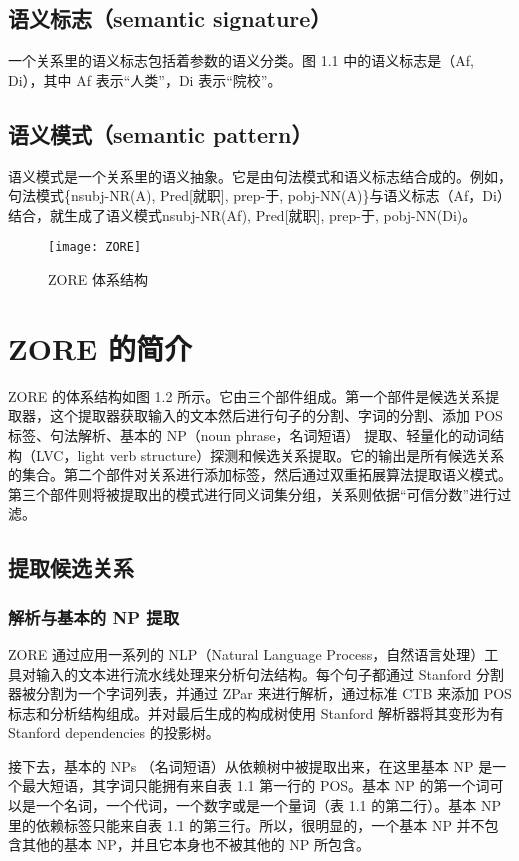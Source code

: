 \subsection{语义标志（semantic signature）}
一个关系里的语义标志包括着参数的语义分类。图 1.1 中的语义标志是（Af, Di），其中 Af 表示“人类”，Di 表示“院校”。

\subsection{语义模式（semantic pattern）}
语义模式是一个关系里的语义抽象。它是由句法模式和语义标志结合成的。例如，句法模式\{nsubj-NR(A), Pred[就职], prep-于, pobj-NN(A)\}与语义标志（Af，Di）结合，就生成了语义模式{nsubj-NR(Af), Pred[就职], prep-于, pobj-NN(Di)}。

\begin{figure}[ht]
\centering
\texttt{[image: ZORE]}
\caption{ZORE 体系结构}\label{fig:ZORE}
\end{figure}

\section{ZORE 的简介}
ZORE 的体系结构如图 1.2 所示。它由三个部件组成。第一个部件是候选关系提取器，这个提取器获取输入的文本然后进行句子的分割、字词的分割、添加 POS 标签、句法解析、基本的 NP（noun phrase，名词短语） 提取、轻量化的动词结构（LVC，light verb structure）探测和候选关系提取。它的输出是所有候选关系的集合。第二个部件对关系进行添加标签，然后通过双重拓展算法提取语义模式。第三个部件则将被提取出的模式进行同义词集分组，关系则依据“可信分数”进行过滤。

\subsection{提取候选关系}

\subsubsection{解析与基本的 NP 提取}
ZORE 通过应用一系列的 NLP（Natural Language Process，自然语言处理）工具对输入的文本进行流水线处理来分析句法结构。每个句子都通过 Stanford 分割器\citep{chang2008}被分割为一个字词列表，并通过 ZPar \citep{zhang2011}来进行解析，通过标准 CTB \citep{xue2005}来添加 POS 标志和分析结构组成。并对最后生成的构成树使用 Stanford 解析器\citep{chang2008}将其变形为有 Stanford dependencies 的投影树。

接下去，基本的 NPs （名词短语）从依赖树中被提取出来，在这里基本 NP 是一个最大短语，其字词只能拥有来自表 1.1 第一行的 POS。基本 NP 的第一个词可以是一个名词，一个代词，一个数字或是一个量词（表 1.1 的第二行）。基本 NP 里的依赖标签只能来自表 1.1 的第三行。所以，很明显的，一个基本 NP 并不包含其他的基本 NP，并且它本身也不被其他的 NP 所包含。

